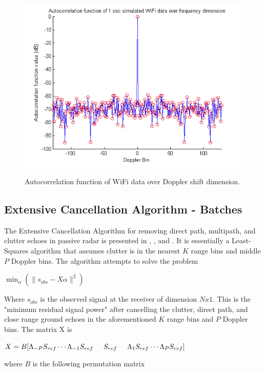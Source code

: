 \documentclass[article,11pt,onecolumn,final]{IEEEtran}
\begin{document}
\begin{figure}
	\caption{Autocorrelation function of WiFi data over Doppler shift dimension.}
	\centering
	\includegraphics[width=400pt]{figures/autocorrdopp.png}
	\label{fig:autocorrdopp}
\end{figure}

\subsection{Extensive Cancellation Algorithm - Batches}

The Extensive Cancellation Algorithm for removing direct path, multipath, and clutter echoes in passive radar is presented in \cite{Colone2006}, \cite{Colone2009}, and \cite{Colone2012}. It is essentially a Least-Squares algorithm that assumes clutter is in the nearest $K$ range bins and middle $P$ Doppler bins. The algorithm attempts to solve the problem

$ \min_{\alpha}(\|s_{obs} - X\alpha\|^2) $

Where $s_{obs}$ is the observed signal at the receiver of dimension $N x 1$. This is the "minimum residual signal power" after cancelling the clutter, direct path, and close range ground echoes in the aforementioned $K$ range bins and $P$ Doppler bins. The matrix X is

$X = B[\Lambda_{-P}S_{ref} \cdots \Lambda_{-1}S_{ref} \hspace{5 mm} S_{ref} \hspace{5mm} \Lambda_{1}S_{ref} \cdots \Lambda_{P}S_{ref}]$

where $B$ is the following permutation matrix
\end{document}
